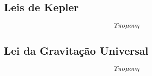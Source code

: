 \subsection{Leis de Kepler}
    \[ \Upsilon \pi o \mu o \nu \eta \]
\subsection{Lei da Gravitação Universal}
    \[ \Upsilon \pi o \mu o \nu \eta \]